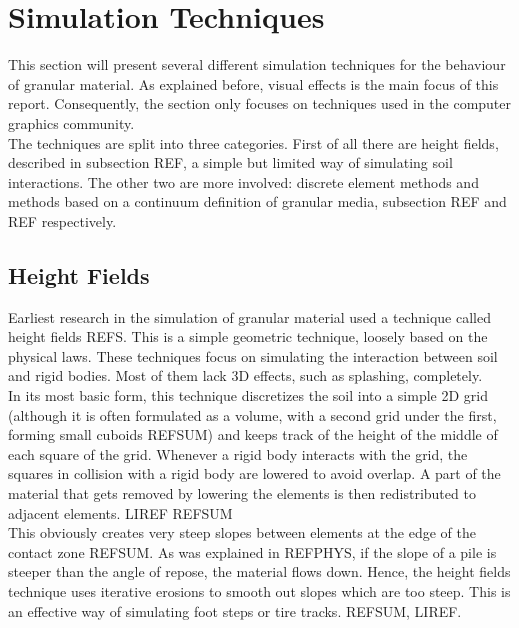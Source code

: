 \ifx\isEmbedded\undefined

\graphicspath{{../img/}}

\tableofcontents
\pagebreak

\fi

\section{Simulation Techniques} \label{sec_tech}
This section will present several different simulation techniques for the behaviour of granular material. As explained before, visual effects is the main focus of this report. Consequently, the section only focuses on techniques used in the computer graphics community.\\

The techniques are split into three categories. First of all there are height fields, described in subsection REF, a simple but limited way of simulating soil interactions. The other two are more involved: discrete element methods and methods based on a continuum definition of granular media, subsection REF and REF respectively.\\

\subsection{Height Fields}
Earliest research in the simulation of granular material used a technique called height fields REFS. This is a simple geometric technique, loosely based on the physical laws. These techniques focus on simulating the interaction between soil and rigid bodies. Most of them lack 3D effects, such as splashing, completely.\\

In its most basic form, this technique discretizes the soil into a simple 2D grid (although it is often formulated as a volume, with a second grid under the first, forming small cuboids REFSUM) and keeps track of the height of the middle of each square of the grid. Whenever a rigid body interacts with the grid, the squares in collision with a rigid body are lowered to avoid overlap. A part of the material that gets removed by lowering the elements is then redistributed to adjacent elements. LIREF REFSUM\\

This obviously creates very steep slopes between elements at the edge of the contact zone REFSUM. As was explained in REFPHYS, if the slope of a pile is steeper than the angle of repose, the material flows down. Hence, the height fields technique uses iterative erosions to smooth out slopes which are too steep. This is an effective way of simulating foot steps or tire tracks. REFSUM, LIREF.\\

